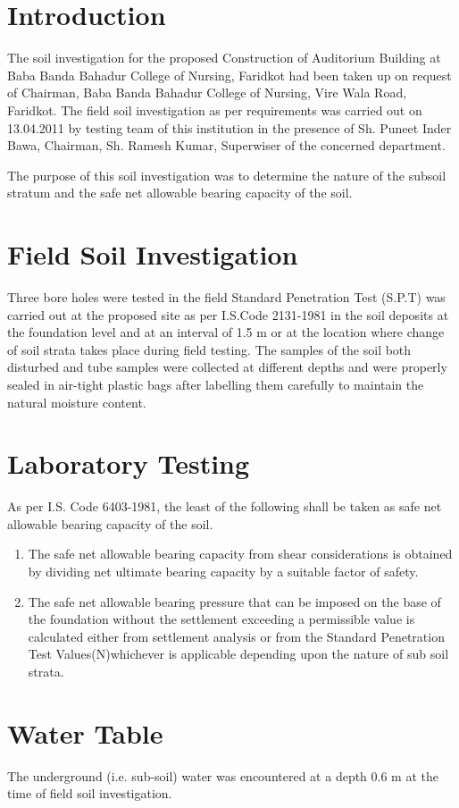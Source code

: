 \documentclass{soil12}
\begin{document}
\section{Introduction}
The soil investigation for the proposed Construction of Auditorium Building at Baba Banda Bahadur
College of Nursing, Faridkot had been taken up on request of Chairman, Baba Banda Bahadur
College of Nursing, Vire Wala Road, Faridkot. The field soil investigation as per requirements was
carried out on 13.04.2011 by testing team of this institution in the presence of Sh. Puneet Inder Bawa,
Chairman, Sh. Ramesh Kumar, Superwiser of the concerned department.\par
The purpose of this soil investigation was to determine the nature of the subsoil stratum and the safe net
allowable bearing capacity of the soil.

\section{Field Soil Investigation}
Three bore holes were tested in the field Standard Penetration Test (S.P.T) was carried out at the proposed
site as per I.S.Code 2131-1981 in the soil deposits at the foundation level and at an interval of 1.5 m or at
the location where change of soil strata takes place during field testing. The samples of the soil both
disturbed and tube samples were collected at different depths and were properly sealed in air-tight plastic
bags after labelling them carefully to maintain the natural moisture content.
\section{Laboratory Testing}
As per I.S. Code 6403-1981, the least of the following shall be taken as safe net allowable bearing
capacity of the soil.
\begin{enumerate}
\item{The safe net allowable bearing capacity from shear considerations is obtained by dividing net
ultimate bearing capacity by a suitable factor of safety.}
\item{The safe net allowable bearing pressure that can be imposed on the base of the foundation
without the settlement exceeding a permissible value is calculated either from settlement
analysis or from the Standard Penetration Test Values(N)whichever is applicable depending
upon the nature of sub soil strata.}
\end{enumerate}
\section{Water Table}
The underground (i.e. sub-soil) water was encountered at a depth 0.6 m at the time of field soil
investigation.
\end{document}
